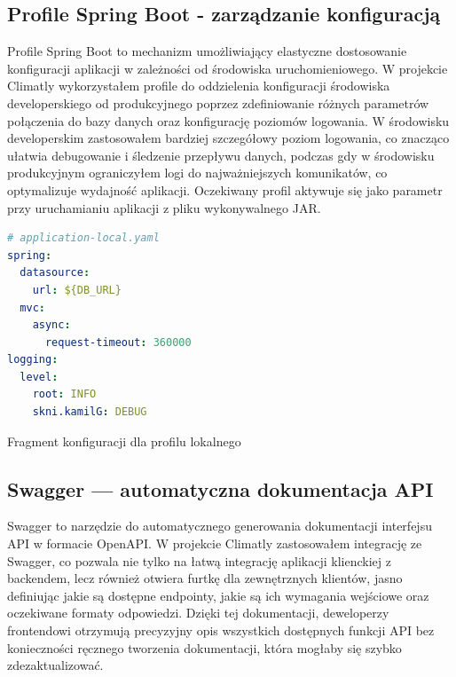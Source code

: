 \documentclass[a4paper,12pt,openany]{book}
\begin{document}
\vspace{2cm}

\subsection*{Profile Spring Boot - zarządzanie konfiguracją}

Profile Spring Boot to mechanizm umożliwiający elastyczne dostosowanie konfiguracji aplikacji w zależności od środowiska uruchomieniowego. W projekcie Climatly wykorzystałem profile do oddzielenia konfiguracji środowiska developerskiego od produkcyjnego poprzez zdefiniowanie różnych parametrów połączenia do bazy danych oraz konfigurację poziomów logowania. W środowisku developerskim zastosowałem bardziej szczegółowy poziom logowania, co znacząco ułatwia debugowanie i śledzenie przepływu danych, podczas gdy w środowisku produkcyjnym ograniczyłem logi do najważniejszych komunikatów, co optymalizuje wydajność aplikacji. Oczekiwany profil aktywuje się jako parametr przy uruchamianiu aplikacji z pliku wykonywalnego JAR.

\begin{lstfloat}[H]
\begin{lstlisting}[language=yaml]
# application-local.yaml
spring:
  datasource:
    url: ${DB_URL}
  mvc:
    async:
      request-timeout: 360000
logging:
  level:
    root: INFO
    skni.kamilG: DEBUG
\end{lstlisting}
\caption{Fragment konfiguracji dla profilu lokalnego}
\label{lst:profile-local}
\end{lstfloat}

\subsection*{Swagger --- automatyczna dokumentacja API}

Swagger to narzędzie do automatycznego generowania dokumentacji interfejsu API w formacie OpenAPI. W projekcie Climatly zastosowałem integrację ze Swagger, co pozwala nie tylko na łatwą integrację aplikacji klienckiej z backendem, lecz również otwiera furtkę dla zewnętrznych klientów, jasno definiując jakie są dostępne endpointy, jakie są ich wymagania wejściowe oraz oczekiwane formaty odpowiedzi. Dzięki tej dokumentacji, deweloperzy frontendowi otrzymują precyzyjny opis wszystkich dostępnych funkcji API bez konieczności ręcznego tworzenia dokumentacji, która mogłaby się szybko zdezaktualizować.
\end{document}
